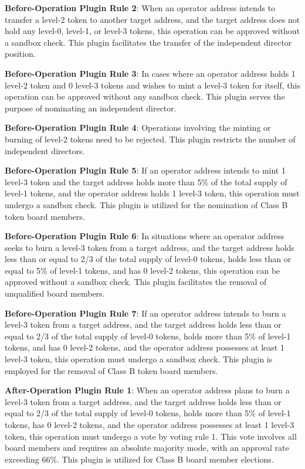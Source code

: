 \documentclass[main.tex]{subfiles}
\begin{document}
\textbf{Before-Operation Plugin Rule 2}: When an operator address intends to transfer a level-2 token to another target address, and the target address does not hold any level-0, level-1, or level-3 tokens, this operation can be approved without a sandbox check. This plugin facilitates the transfer of the independent director position.

\textbf{Before-Operation Plugin Rule 3}: In cases where an operator address holds 1 level-2 token and 0 level-3 tokens and wishes to mint a level-3 token for itself, this operation can be approved without any sandbox check. This plugin serves the purpose of nominating an independent director.

\textbf{Before-Operation Plugin Rule 4}: Operations involving the minting or burning of level-2 tokens need to be rejected. This plugin restricts the number of independent directors.

\textbf{Before-Operation Plugin Rule 5}: If an operator address intends to mint 1 level-3 token and the target address holds more than 5\% of the total supply of level-1 tokens, and the operator address holds 1 level-3 token, this operation must undergo a sandbox check. This plugin is utilized for the nomination of Class B token board members.

\textbf{Before-Operation Plugin Rule 6}: In situations where an operator address seeks to burn a level-3 token from a target address, and the target address holds less than or equal to 2/3 of the total supply of level-0 tokens, holds less than or equal to 5\% of level-1 tokens, and has 0 level-2 tokens, this operation can be approved without a sandbox check. This plugin facilitates the removal of unqualified board members.

\textbf{Before-Operation Plugin Rule 7}: If an operator address intends to burn a level-3 token from a target address, and the target address holds less than or equal to 2/3 of the total supply of level-0 tokens, holds more than 5\% of level-1 tokens, and has 0 level-2 tokens, and the operator address possesses at least 1 level-3 token, this operation must undergo a sandbox check. This plugin is employed for the removal of Class B token board members.


\textbf{After-Operation Plugin Rule 1}: When an operator address plans to burn a level-3 token from a target address, and the target address holds less than or equal to 2/3 of the total supply of level-0 tokens, holds more than 5\% of level-1 tokens, has 0 level-2 tokens, and the operator address possesses at least 1 level-3 token, this operation must undergo a vote by voting rule 1. This vote involves all board members and requires an absolute majority mode, with an approval rate exceeding 66\%. This plugin is utilized for Class B board member elections.
\end{document}
